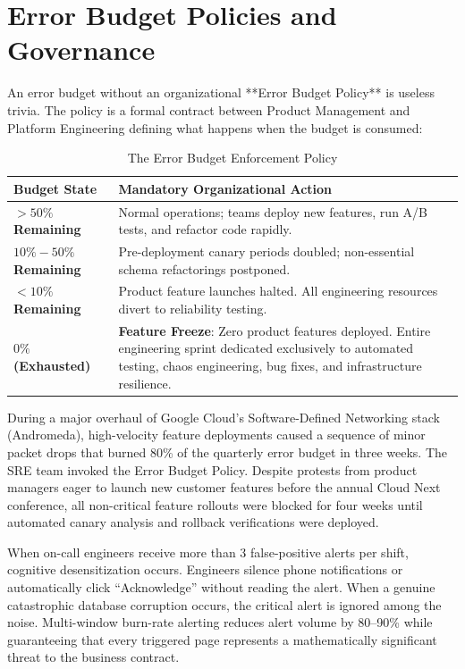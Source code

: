 \section{Error Budget Policies and Governance}

An error budget without an organizational **Error Budget Policy** is useless trivia. The policy is a formal contract between Product Management and Platform Engineering defining what happens when the budget is consumed:

\begin{table}[htbp]
\centering\small
\begin{tabular}{lp{10.5cm}}
\toprule
\textbf{Budget State} & \textbf{Mandatory Organizational Action} \\
\midrule
\textbf{$>50\%$ Remaining} & Normal operations; teams deploy new features, run A/B tests, and refactor code rapidly. \\
\textbf{$10\% - 50\%$ Remaining} & Pre-deployment canary periods doubled; non-essential schema refactorings postponed. \\
\textbf{$<10\%$ Remaining} & Product feature launches halted. All engineering resources divert to reliability testing. \\
\textbf{$0\%$ (Exhausted)} & \textbf{Feature Freeze}: Zero product features deployed. Entire engineering sprint dedicated exclusively to automated testing, chaos engineering, bug fixes, and infrastructure resilience. \\
\bottomrule
\end{tabular}
\caption{The Error Budget Enforcement Policy}
\label{tab:budget-policy}
\end{table}

\begin{realworldbox}
During a major overhaul of Google Cloud's Software-Defined Networking stack (Andromeda), high-velocity feature deployments caused a sequence of minor packet drops that burned 80\% of the quarterly error budget in three weeks. The SRE team invoked the Error Budget Policy. Despite protests from product managers eager to launch new customer features before the annual Cloud Next conference, all non-critical feature rollouts were blocked for four weeks until automated canary analysis and rollback verifications were deployed.
\end{realworldbox}

\begin{productionwarningbox}
When on-call engineers receive more than 3 false-positive alerts per shift, cognitive desensitization occurs. Engineers silence phone notifications or automatically click ``Acknowledge'' without reading the alert. When a genuine catastrophic database corruption occurs, the critical alert is ignored among the noise. Multi-window burn-rate alerting reduces alert volume by 80--90\% while guaranteeing that every triggered page represents a mathematically significant threat to the business contract.
\end{productionwarningbox}

